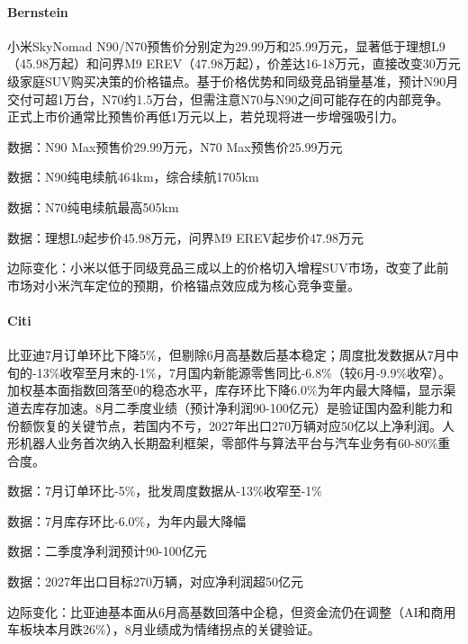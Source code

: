 \documentclass[11pt]{ctexart}
\begin{document}
\paragraph{Bernstein} 小米SkyNomad N90/N70预售价分别定为29.99万和25.99万元，显著低于理想L9（45.98万起）和问界M9 EREV（47.98万起），价差达16-18万元，直接改变30万元级家庭SUV购买决策的价格锚点。基于价格优势和同级竞品销量基准，预计N90月交付可超1万台，N70约1.5万台，但需注意N70与N90之间可能存在的内部竞争。正式上市价通常比预售价再低1万元以上，若兑现将进一步增强吸引力。
{\small\color{refgray}数据：N90 Max预售价29.99万元，N70 Max预售价25.99万元\par}
{\small\color{refgray}数据：N90纯电续航464km，综合续航1705km\par}
{\small\color{refgray}数据：N70纯电续航最高505km\par}
{\small\color{refgray}数据：理想L9起步价45.98万元，问界M9 EREV起步价47.98万元\par}
{\small\color{refgray}边际变化：小米以低于同级竞品三成以上的价格切入增程SUV市场，改变了此前市场对小米汽车定位的预期，价格锚点效应成为核心竞争变量。\par}
\paragraph{Citi} 比亚迪7月订单环比下降5\%，但剔除6月高基数后基本稳定；周度批发数据从7月中旬的-13\%收窄至月末的-1\%，7月国内新能源零售同比-6.8\%（较6月-9.9\%收窄）。加权基本面指数回落至0的稳态水平，库存环比下降6.0\%为年内最大降幅，显示渠道去库存加速。8月二季度业绩（预计净利润90-100亿元）是验证国内盈利能力和份额恢复的关键节点，若国内不亏，2027年出口270万辆对应50亿以上净利润。人形机器人业务首次纳入长期盈利框架，零部件与算法平台与汽车业务有60-80\%重合度。
{\small\color{refgray}数据：7月订单环比-5\%，批发周度数据从-13\%收窄至-1\%\par}
{\small\color{refgray}数据：7月库存环比-6.0\%，为年内最大降幅\par}
{\small\color{refgray}数据：二季度净利润预计90-100亿元\par}
{\small\color{refgray}数据：2027年出口目标270万辆，对应净利润超50亿元\par}
{\small\color{refgray}边际变化：比亚迪基本面从6月高基数回落中企稳，但资金流仍在调整（AI和商用车板块本月跌26\%），8月业绩成为情绪拐点的关键验证。\par}
\end{document}
